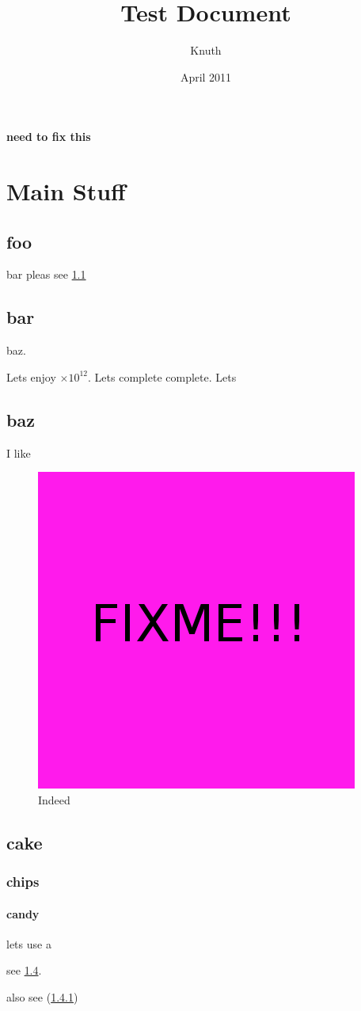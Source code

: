 \documentclass[12pt]{book}
\title{Test Document}
\author{Knuth}
\date{April 2011}
\newcommand{\testcite}[1]{\cite{#1}}
\newcommand{\testref}[1]{(\ref{#1})}
\newcommand{\teste}[1]{\ensuremath{\times 10^{#1}}}
\newcommand{\testissue}[1]{\textbf{#1}}
\begin{document}
\maketitle

\testissue{need to fix this}

\chapter{Main Stuff}
\section{foo}
bar pleas see \ref{fig:fixme}

\section{bar}
baz.

Lets enjoy \teste{12}. Lets complete complete. Lets \testcite{dijkstra68}


\section{baz}
I like \cite{dijkstra76}

\begin{figure}
    \centering
	\includegraphics[scale=1.00]{FIXME}
	\caption{Indeed}
	\label{fig:fixme}
\end{figure}

\section{cake}\label{sec:foo}
\subsection{chips}\label{sec:bar}
\subsubsection{candy}\label{sec:baz}

lets use a \testcite{dijkstra68}

see \ref{sec:foo}.

also see \testref{sec:bar}






\end{document}
